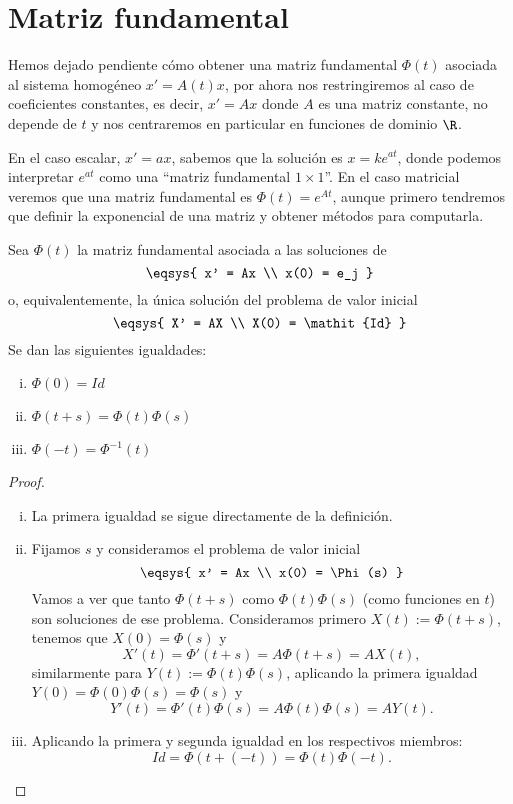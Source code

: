 \documentclass[../main.tex]{subfiles}
\begin{document}
\section{Matriz fundamental}

Hemos dejado pendiente cómo obtener una matriz fundamental \(\Phi(t)\) asociada
al sistema homogéneo \(x' = A(t)x\), por ahora nos restringiremos al caso de
coeficientes constantes, es decir, \(x' = Ax\) donde \(A\) es una matriz
constante, no depende de \(t\) y nos centraremos en particular en funciones de 
dominio \(\R\).  

En el caso escalar, \(x' = ax\), sabemos que la solución es \(x = ke^{at}\),
donde podemos interpretar \(e^{at}\) como una ``matriz fundamental
\(1 \times 1\)''. En el caso matricial veremos que una matriz fundamental es
\(\Phi(t) = e^{At}\), aunque primero tendremos que definir la exponencial de una
matriz y obtener métodos para computarla.

\begin{lemma}
\label{lem:expphi}
	Sea \(\Phi(t)\) la matriz fundamental asociada a las soluciones de
	\[\eqsys{
		x' = Ax \\
		x(0) = e_j
		}\]
      o, equivalentemente, la única solución del problema de valor inicial
	\[\eqsys{
		X' = AX \\
		X(0) = \mathit{Id}
		}\]
	Se dan las siguientes igualdades:
	\begin{multicols}{3}
	\begin{enumerate}[i)]
		\item \(\displaystyle \Phi(0) = \mathit{Id}\) 
		\item \(\displaystyle \Phi(t + s) = \Phi(t) \Phi(s)\) 
		\item \(\displaystyle \Phi(-t) = \Phi^{-1}(t)\) 
	\end{enumerate}
	\end{multicols}
\end{lemma}

\begin{proof}
	\begin{enumerate}[i), wide, labelwidth=0pt, labelindent=0pt]
		\item La primera igualdad se sigue directamente de la definición.
		\item Fijamos \(s\) y consideramos el problema de valor inicial
			\[\eqsys{ x' = Ax \\ x(0) = \Phi(s) }\]
			Vamos a ver que tanto \(\Phi(t + s)\) como \(\Phi(t)\Phi(s)\) (como
			funciones en \(t\)) son soluciones de ese problema. Consideramos
			primero \(X(t) := \Phi(t + s)\), tenemos que \(X(0) = \Phi(s)\) y
			\[X'(t) = \Phi'(t + s) = A \Phi(t + s) = A X(t),\]
			similarmente para \(Y(t) := \Phi(t)\Phi(s)\), aplicando la primera 
			igualdad \(Y(0) = \Phi(0)\Phi(s) = \Phi(s)\) y
			\[Y'(t) = \Phi'(t)\Phi(s) = A \Phi(t)\Phi(s) = A Y(t).\]
		\item Aplicando la primera y segunda igualdad en los respectivos
			miembros:
			\[\mathit{Id} = \Phi(t + (-t)) = \Phi(t)\Phi(-t).\]
	\end{enumerate}
\end{proof}
\end{document}
